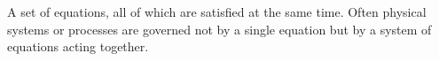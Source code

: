 A set of equations, all of which are satisfied at the same time.
Often physical systems or processes are governed not by a single
equation but by a system of equations acting together.